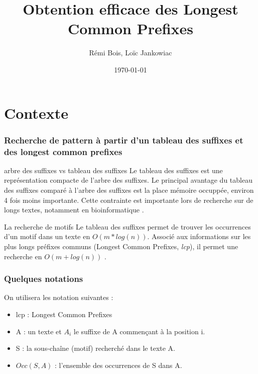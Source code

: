 \documentclass[10pt]{beamer}
\title{Obtention efficace des Longest Common Prefixes}
\author{Rémi Bois, Loïc Jankowiac}
\date{\today}
\begin{document}
\begin{frame}
  \maketitle

\end{frame}

\begin{frame}
  \tableofcontents
\end{frame}

\section{Contexte}
\label{sec:context}



\begin{frame}
  \frametitle{Recherche de pattern à partir d'un tableau des suffixes
    et des longest common prefixes}

  \begin{block}{arbre des suffixes vs tableau des suffixes} 
    Le tableau des suffixes est une représentation compacte de l'arbre
    des suffixes. Le principal avantage du tableau des suffixes comparé à
    l'arbre des suffixes est la place mémoire occuppée, environ 4 fois
    moins importante. Cette contrainte est importante lors de
    recherche sur de longs textes, notamment en bioinformatique \cite{Raffinot11}.
  \end{block}

  \pause

  \begin{block}{La recherche de motifs}
    Le tableau des suffixes permet de trouver les occurrences d'un
    motif dans un texte en $O(m*log(n))$. Associé aux informations sur
    les plus longs préfixes communs (Longest Common Prefixes,
    \emph{lcp}), il permet une recherche en $O(m + log(n))$ \cite{Manber93}.
  \end{block}
  
\end{frame}

\begin{frame}
  \frametitle{Quelques notations}
  On utilisera les notation suivantes :

  \begin{itemize}
  \item lcp : Longest Common Prefixes
  \item A : un texte et $A_i$ le suffixe de A commençant à la position i.
  \item S : la sous-chaîne (motif) recherché dans le texte A.
  \item $Occ(S, A)$ : l'ensemble des occurrences de S dans A.
  \end{itemize}
\end{frame}
\end{document}
